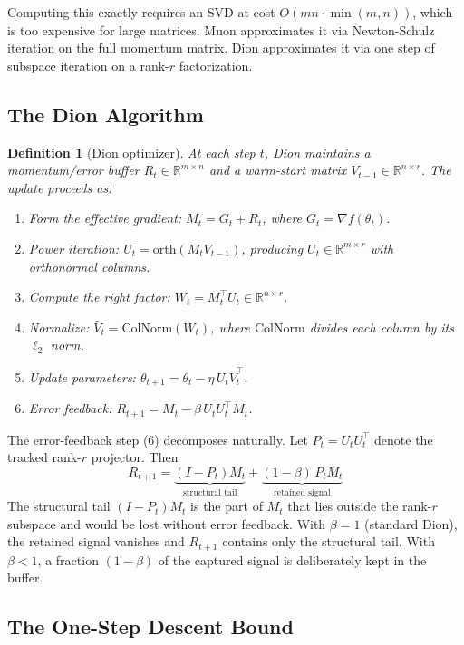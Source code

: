 \documentclass[11pt]{article}
\newcommand{\R}{\mathbb{R}}
\newtheorem{definition}{Definition}
\begin{document}
Computing this exactly requires an SVD at cost $O(mn \cdot \min(m,n))$, which is too expensive for large matrices. Muon approximates it via Newton-Schulz iteration on the full momentum matrix. Dion approximates it via one step of subspace iteration on a rank-$r$ factorization.

\subsection{The Dion Algorithm}

\begin{definition}[Dion optimizer]
At each step $t$, Dion maintains a momentum/error buffer $R_t \in \R^{m \times n}$ and a warm-start matrix $V_{t-1} \in \R^{n \times r}$. The update proceeds as:
\begin{enumerate}[nosep]
    \item Form the effective gradient: $M_t = G_t + R_t$, where $G_t = \nabla f(\theta_t)$.
    \item Power iteration: $U_t = \mathrm{orth}(M_t V_{t-1})$, producing $U_t \in \R^{m \times r}$ with orthonormal columns.
    \item Compute the right factor: $W_t = M_t^\top U_t \in \R^{n \times r}$.
    \item Normalize: $\bar{V}_t = \mathrm{ColNorm}(W_t)$, where $\mathrm{ColNorm}$ divides each column by its $\ell_2$ norm.
    \item Update parameters: $\theta_{t+1} = \theta_t - \eta \, U_t \bar{V}_t^\top$.
    \item Error feedback: $R_{t+1} = M_t - \beta \, U_t U_t^\top M_t$.
\end{enumerate}
\end{definition}

The error-feedback step (6) decomposes naturally. Let $P_t = U_t U_t^\top$ denote the tracked rank-$r$ projector. Then
\begin{equation}
R_{t+1} = \underbrace{(I - P_t) M_t}_{\text{structural tail}} + \underbrace{(1-\beta) \, P_t M_t}_{\text{retained signal}}
\label{eq:ef_decomp}
\end{equation}
The structural tail $(I - P_t) M_t$ is the part of $M_t$ that lies outside the rank-$r$ subspace and would be lost without error feedback. With $\beta = 1$ (standard Dion), the retained signal vanishes and $R_{t+1}$ contains only the structural tail. With $\beta < 1$, a fraction $(1-\beta)$ of the captured signal is deliberately kept in the buffer.

\subsection{The One-Step Descent Bound}
\end{document}
